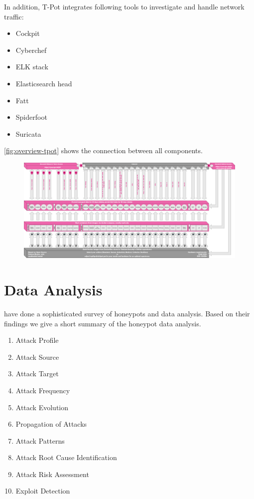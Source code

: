 In addition, T-Pot integrates following tools to investigate and handle network traffic:

\begin{itemize}
    \item Cockpit
    \item Cyberchef
    \item ELK stack
    \item Elasticsearch head
    \item Fatt
    \item Spiderfoot
    \item Suricata
\end{itemize}

\autoref{fig:overview-tpot} shows the connection between all components.

\begin{figure}
    \centering
    \includegraphics[width=\textwidth]{figures/architecture.png}
    \caption{}
    \label{fig:overview-tpot}
\end{figure}

\section{Data Analysis}

\citet{NawrockiWSKS2016} have done a sophisticated survey of honeypots and data analysis.
Based on their findings we give a short summary of the honeypot data analysis.

\begin{enumerate}
    \item Attack Profile
    \item Attack Source
    \item Attack Target
    \item Attack Frequency
    \item Attack Evolution
    \item Propagation of Attacks
    \item Attack Patterns
    \item Attack Root Cause Identification
    \item Attack Risk Assessment
    \item Exploit Detection
\end{enumerate}


